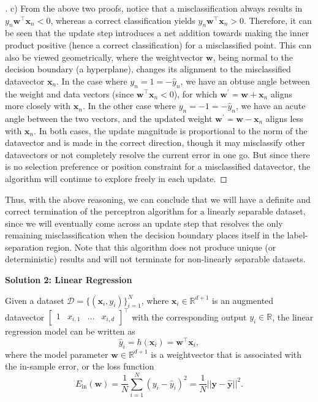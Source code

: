 \documentclass{article}
\newcommand{\R}{\mathbb{R}}
\newcommand{\mat}[1]{\begin{bmatrix}#1\end{bmatrix}}
\renewcommand{\vec}[1]{\mathbf{#1}}
\begin{document}
    \begin{proof}[\unskip\nopunct]
        c) From the above two proofs, notice that a misclassification always 
        results in $y_n\vec{w}^\intercal \vec{x}_n < 0$, whereas 
        a correct classification yields $y_n\vec{w}^\intercal \vec{x}_n
        > 0$. Therefore, it can be seen that the update step introduces a net
        addition towards making the inner product positive (hence a correct 
        classification) for a misclassified point. 
        This can also be viewed geometrically, where
        the weightvector $\vec{w}$, being normal to the decision boundary (a 
        hyperplane), changes its alignment to the misclassified datavector 
        $\vec{x}_n$. In the case where $y_n = 1 = -\hat{y}_n$, we have an 
        obtuse angle between the  weight and data vectors (since $\vec
        {w}^\intercal \vec{x}_n < 0$), for which $\vec{w} ^{\prime} = \vec{w}+
        \vec{x}_n$ aligns more closely with $\vec{x}_n$. In the other case 
        where $y_n = -1 = -\hat{y}_n$, we have an acute angle between the two
        vectors, and the updated weight $\vec{w}^{\prime} =
        \vec{w} - \vec{x}_n$ aligns less with $\vec{x}_n$. In both cases, the
        update magnitude is proportional to the norm of the datavector and 
        is made in the correct direction, though it may misclassify other 
        datavectors or not completely resolve the current error in one go.
        But since there is no selection preference or position constraint for 
        a misclassified datavector, the algorithm will continue to explore 
        freely in each update.
    \end{proof}

    Thus, with the above reasoning, we can conclude that we will have a
    definite and correct termination of the perceptron algorithm for a 
    linearly separable dataset, since we will eventually come across an
    update step that resolves the only remaining misclassification when the
    decision boundary places itself in the label-separation region. Note that
    this algorithm does not produce unique (or deterministic) results and 
    will not terminate for non-linearly separable datasets.
    
    \vspace{0.5cm}

    \textbf{Solution 2: Linear Regression}

    Given a dataset $\mathcal{D} = \{(\vec{x}_i, y_i)\}_{i=1}^N$, where 
    $\vec{x}_i\in\R^{d+1}$ is an augmented datavector 
    $\mat{1 & x_{i,1} & \ldots & x_{i, d}}^\intercal$ with the corresponding 
    output $y_i \in \R$, the linear regression model can be written as
    \begin{equation}
       \hat{y}_i = h(\vec{x}_i) = \vec{w}^\intercal\vec{x}_i,
    \end{equation}
    where the model parameter $\vec{w} \in \R^{d+1}$ is a weightvector that
    is associated with the in-sample error, or the loss function 
    \begin{equation}
        \label{eqn:loss_fun_regression}
        E_{\text{in}}(\vec{w}) = \frac{1}{N}\sum_{i=1}^N (y_i - \hat{y}_i)^2 
        = \frac{1}{N}||\vec{y}-\hat{\vec{y}}||^2.
    \end{equation}
\end{document}
